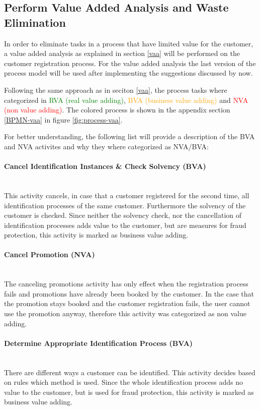 \subsection{Perform Value Added Analysis and Waste Elimination}\label{improv-vaa}
In order to eliminate tasks in a process that have limited value for the customer, a value added analysis as explained in section \ref{vaa} will be performed on the customer registration process. For the value added analysis the last version of the process model will be used after implementing the suggestions discussed by now. 

Following the same approach as in seciton \ref{vaa}, the process tasks where categorized in \textcolor{green}{RVA (real value adding)}, \textcolor{orange}{BVA (business value adding)} and \textcolor{red}{NVA (non value adding)}. The colored process is shown in the appendix section \ref{BPMN-vaa} in figure \ref{fig:process-vaa}.

For better understanding, the following list will provide a description of the BVA and NVA activites and why they where categorized as NVA/BVA:

\paragraph{Cancel Identification  Instances \& Check Solvency (BVA)}~\\ 
This activity cancels, in case that a customer registered for the second time, all identification processes of the same customer. Furthermore the solvency of the customer is checked. Since neither the solvency check, nor the cancellation of identification processes adds value to the customer, but are measures for fraud protection, this activity is marked as business value adding. 
\paragraph{Cancel Promotion (NVA)}~\\ 
 The canceling promotions activity has only effect when the registration process fails and promotions have already been booked by the customer. In the case that the promotion stays booked and the customer registration fails, the user cannot use the promotion anyway, therefore this activity was categorized as non value adding.
\paragraph{Determine Appropriate Identification Process (BVA)}~\\ 
 There are different ways a customer can be identified. This activity decides based on rules which method is used. Since the whole identification process adds no value to the customer, but is used for fraud protection, this activity is marked as business value adding. 
